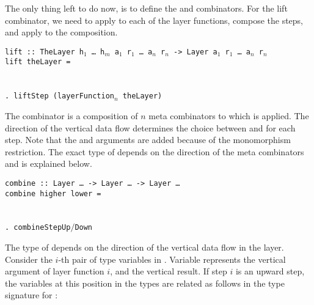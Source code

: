 
The only thing left to do now, is to define the  and  combinators. For the lift combinator, we need to apply  to each of the layer functions, compose the steps, and apply  to the composition. 

\begin{small}
\begin{tabbing}
{\tt lift}\verb| :: |{\tt TheLayer h$_1$ \dots ~h$_m$ a$_1$ r$_1$ \dots ~a$_n$ r$_n$ -> Layer a$_1$ r$_1$ \dots ~a$_n$ r$_n$}\\
{\tt li}\={\tt ft t}\={\tt heLayer = }\\
\\
\>\>{\tt \dots}\\ 
\>\>\verb|. lift|{\tt Step (layerFunction$_n$ theLayer)}
\end{tabbing}
\end{small}


The  combinator is a composition of $n$  meta combinators to which  is applied. The direction of the vertical data flow determines the choice between  and  for each step. \bc Note that the  and  arguments are added because of the monomorphism restriction. \ec The exact type of  depends on the direction of the meta combinators and is explained below. 

\begin{small}
\begin{tabbing}
{\tt combine}\verb| :: |{\tt Layer \dots}\verb| -> |{\tt Layer \dots}\verb| -> |{\tt Layer \dots }\\
{\tt co}\={\tt mbin}\={\tt e higher lower = }\\
\\
\>\>{\tt \dots}\\ 
\>\>\verb|. combine|{\tt StepUp$/$Down}\\
\>
\end{tabbing}
\end{small}

The type of  depends on the direction of the vertical data flow in the layer. Consider the $i$-th pair of  type variables in . Variable  represents the vertical argument of layer function $i$, and  the vertical result. If step $i$ is an upward step, the variables at this position in the  types are related as follows in the type signature for :

